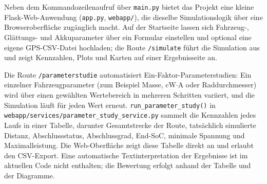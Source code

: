 Neben dem Kommandozeilenaufruf über \texttt{main.py} bietet das Projekt eine kleine Flask-Web-Anwendung (\texttt{app.py}, \texttt{webapp/}), die dieselbe Simulationslogik über eine Browseroberfläche zugänglich macht. Auf der Startseite lassen sich Fahrzeug-, Glättungs- und Akkuparameter über ein Formular einstellen und optional eine eigene GPS-CSV-Datei hochladen; die Route \texttt{/simulate} führt die Simulation aus und zeigt Kennzahlen, Plots und Karten auf einer Ergebnisseite an.

Die Route \texttt{/parameterstudie} automatisiert Ein-Faktor-Parameterstudien: Ein einzelner Fahrzeugparameter (zum Beispiel Masse, cW$\cdot$A oder Raddurchmesser) wird über einen gewählten Wertebereich in mehreren Schritten variiert, und die Simulation läuft für jeden Wert erneut. \texttt{run\_parameter\_study()} in \texttt{webapp/services/parameter\_study\_service.py} sammelt die Kennzahlen jedes Laufs in einer Tabelle, darunter Gesamtstrecke der Route, tatsächlich simulierte Distanz, Abschlussstatus, Abschlussgrad, End-SoC, minimale Spannung und Maximalleistung. Die Web-Oberfläche zeigt diese Tabelle direkt an und erlaubt den CSV-Export. Eine automatische Textinterpretation der Ergebnisse ist im aktuellen Code nicht enthalten; die Bewertung erfolgt anhand der Tabelle und der Diagramme.
